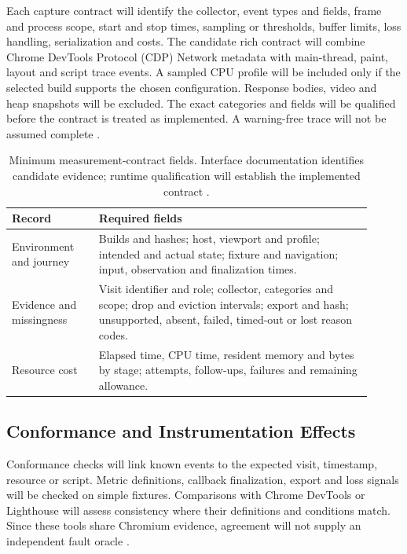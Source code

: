 Each capture contract will identify the collector, event types and fields, frame and process scope, start and stop times, sampling or thresholds, buffer limits, loss handling, serialization and costs. The candidate rich contract will combine Chrome DevTools Protocol (CDP) Network metadata with main-thread, paint, layout and script trace events. A sampled CPU profile will be included only if the selected build supports the chosen configuration. Response bodies, video and heap snapshots will be excluded. The exact categories and fields will be qualified before the contract is treated as implemented. A warning-free trace will not be assumed complete \parencite{REP5RHB6,63QKVL86,UMVA36NP,VMWYVJKL}.

\begin{table}[htbp]
\centering
\caption{Minimum measurement-contract fields. Interface documentation identifies candidate evidence; runtime qualification will establish the implemented contract \parencite{REP5RHB6,N33VTKAN,63QKVL86}.}
\label{tab:measurement-contract}
\begin{tabular}{p{0.22\linewidth}p{0.69\linewidth}}
\toprule
Record & Required fields \\
\midrule
Environment and journey & Builds and hashes; host, viewport and profile; intended and actual state; fixture and navigation; input, observation and finalization times. \\
Evidence and missingness & Visit identifier and role; collector, categories and scope; drop and eviction intervals; export and hash; unsupported, absent, failed, timed-out or lost reason codes. \\
Resource cost & Elapsed time, CPU time, resident memory and bytes by stage; attempts, follow-ups, failures and remaining allowance. \\
\bottomrule
\end{tabular}
\end{table}

\subsection{Conformance and Instrumentation Effects}

Conformance checks will link known events to the expected visit, timestamp, resource or script. Metric definitions, callback finalization, export and loss signals will be checked on simple fixtures. Comparisons with Chrome DevTools or Lighthouse will assess consistency where their definitions and conditions match. Since these tools share Chromium evidence, agreement will not supply an independent fault oracle \parencite{AAW3TPVK,4MGN3SYQ,VMWYVJKL,9WMJW57H}.

